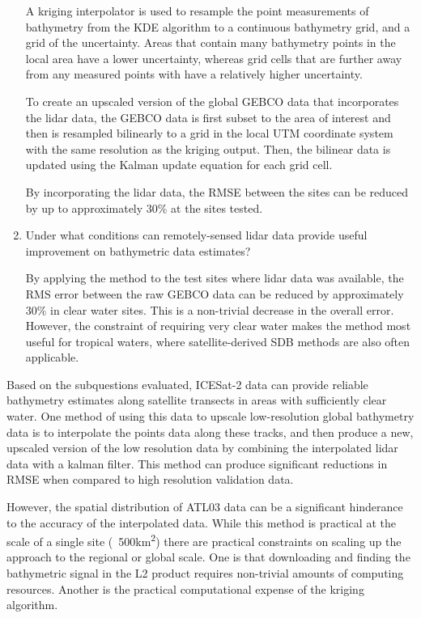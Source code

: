 \begin{enumerate}
    A kriging interpolator is used to resample the point measurements of bathymetry from the KDE algorithm to a continuous bathymetry grid, and a grid of the uncertainty. Areas that contain many bathymetry points in the local area have a lower uncertainty, whereas grid cells that are further away from any measured points with have a relatively higher uncertainty.

    To create an upscaled version of the global GEBCO data that incorporates the lidar data, the GEBCO data is first subset to the area of interest and then is resampled bilinearly to a grid in the local UTM coordinate system with the same resolution as the kriging output. Then, the bilinear data is updated using the Kalman update equation for each grid cell. 

    By incorporating the lidar data, the RMSE between the sites can be reduced by up to approximately 30\% at the sites tested.
    
    \item Under what conditions can remotely-sensed lidar data provide useful improvement on bathymetric data estimates?
    
    By applying the method to the test sites where lidar data was available, the RMS error between the raw GEBCO data can be reduced by approximately 30\% in clear water sites. This is a non-trivial decrease in the overall error. However, the constraint of requiring very clear water makes the method most useful for tropical waters, where satellite-derived SDB methods are also often applicable. 


\end{enumerate}

Based on the subquestions evaluated, ICESat-2 data can provide reliable bathymetry estimates along satellite transects in areas with sufficiently clear water. One method of using this data to upscale low-resolution global bathymetry data is to interpolate the points data along these tracks, and then produce a new, upscaled version of the low resolution data by combining the interpolated lidar data with a kalman filter. This method can produce significant reductions in RMSE when compared to high resolution validation data. 

However, the spatial distribution of ATL03 data can be a significant hinderance to the accuracy of the interpolated data. While this method is practical at the scale of a single site (~500\si{km^2}) there are practical constraints on scaling up the approach to the regional or global scale. One is that downloading and finding the bathymetric signal in the L2 product requires non-trivial amounts of computing resources. Another is the practical computational expense of the kriging algorithm.

